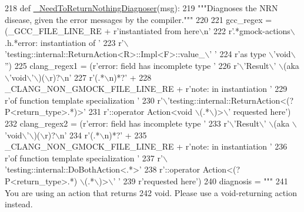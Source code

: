 \begin{DoxyCode}
218 \textcolor{keyword}{def }\hyperlink{namespacegmock__doctor_a1d30848b5afc8437c05c03f9d4878a0d}{\_NeedToReturnNothingDiagnoser}(msg):
219   \textcolor{stringliteral}{"""Diagnoses the NRN disease, given the error messages by the compiler."""}
220 
221   gcc\_regex = (\_GCC\_FILE\_LINE\_RE + \textcolor{stringliteral}{r'instantiated from here\(\backslash\)n'}
222                \textcolor{stringliteral}{r'.*gmock-actions\(\backslash\).h.*error: instantiation of '}
223                \textcolor{stringliteral}{r'\(\backslash\)'testing::internal::ReturnAction<R>::Impl<F>::value\_\(\backslash\)' '}
224                \textcolor{stringliteral}{r'as type \(\backslash\)'void\(\backslash\)''})
225   clang\_regex1 = (\textcolor{stringliteral}{r'error: field has incomplete type '}
226                   \textcolor{stringliteral}{r'\(\backslash\)'Result\(\backslash\)' \(\backslash\)(aka \(\backslash\)'void\(\backslash\)'\(\backslash\))(\(\backslash\)r)?\(\backslash\)n'}
227                   \textcolor{stringliteral}{r'(.*\(\backslash\)n)*?'} +
228                   \_CLANG\_NON\_GMOCK\_FILE\_LINE\_RE + \textcolor{stringliteral}{r'note: in instantiation '}
229                   \textcolor{stringliteral}{r'of function template specialization '}
230                   \textcolor{stringliteral}{r'\(\backslash\)'testing::internal::ReturnAction<(?P<return\_type>.*)>'}
231                   \textcolor{stringliteral}{r'::operator Action<void \(\backslash\)(.*\(\backslash\))>\(\backslash\)' requested here'})
232   clang\_regex2 = (\textcolor{stringliteral}{r'error: field has incomplete type '}
233                   \textcolor{stringliteral}{r'\(\backslash\)'Result\(\backslash\)' \(\backslash\)(aka \(\backslash\)'void\(\backslash\)'\(\backslash\))(\(\backslash\)r)?\(\backslash\)n'}
234                   \textcolor{stringliteral}{r'(.*\(\backslash\)n)*?'} +
235                   \_CLANG\_NON\_GMOCK\_FILE\_LINE\_RE + \textcolor{stringliteral}{r'note: in instantiation '}
236                   \textcolor{stringliteral}{r'of function template specialization '}
237                   \textcolor{stringliteral}{r'\(\backslash\)'testing::internal::DoBothAction<.*>'}
238                   \textcolor{stringliteral}{r'::operator Action<(?P<return\_type>.*) \(\backslash\)(.*\(\backslash\))>\(\backslash\)' '}
239                   \textcolor{stringliteral}{r'requested here'})
240   diagnosis = \textcolor{stringliteral}{"""}
241 \textcolor{stringliteral}{You are using an action that returns %
242 \textcolor{stringliteral}{void.  Please use a void-returning action instead.}
}
\end{DoxyCode}

